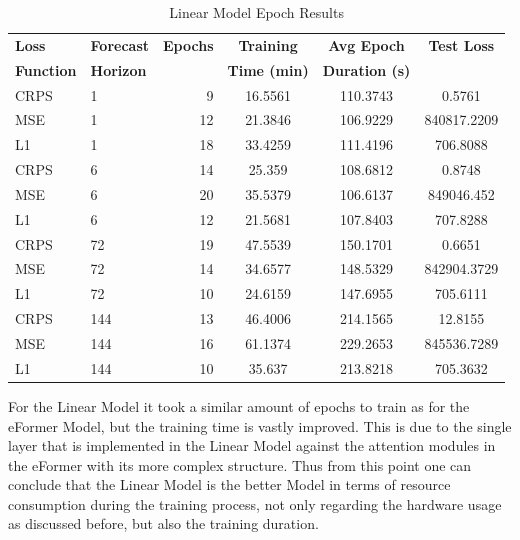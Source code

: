 \documentclass{article}
\begin{document}
\begin{table}
    \footnotesize
    \centering
    \caption{Linear Model Epoch Results}
    \begin{tabular}{l|l|r|S|S|S}
        \toprule
        \textbf{Loss} & \textbf{Forecast} & \textbf{Epochs} & \textbf{Training} & \textbf{Avg Epoch} & \textbf{Test Loss} \\
        \textbf{Function} & \textbf{Horizon} & & \textbf{Time (min)} & \textbf{Duration (s)} & \\
        \midrule
        CRPS & 1 & 9 & 16.5561 & 110.3743 & 0.5761 \\
        MSE & 1 & 12 & 21.3846 & 106.9229 & 840817.2209 \\
        L1 & 1 & 18 & 33.4259 & 111.4196 & 706.8088 \\
        \midrule
        CRPS & 6 & 14 & 25.359 & 108.6812 & 0.8748 \\
        MSE & 6 & 20 & 35.5379 & 106.6137 & 849046.452 \\
        L1 & 6 & 12 & 21.5681 & 107.8403 & 707.8288 \\
        \midrule
        CRPS & 72 & 19 & 47.5539 & 150.1701 & 0.6651 \\
        MSE & 72 & 14 & 34.6577 & 148.5329 & 842904.3729 \\
        L1 & 72 & 10 & 24.6159 & 147.6955 & 705.6111 \\
        \midrule
        CRPS & 144 & 13 & 46.4006 & 214.1565 & 12.8155 \\
        MSE & 144 & 16 & 61.1374 & 229.2653 & 845536.7289 \\
        L1 & 144 & 10 & 35.637 & 213.8218 & 705.3632 \\
    \bottomrule
    \end{tabular}
    \label{tab:linear_epoch}
\end{table}

For the Linear Model it took a similar amount of epochs to train as for the eFormer Model, but the training time is vastly improved. This is due to the single layer that is implemented in the Linear Model against the attention modules in the eFormer with its more complex structure. Thus from this point one can conclude that the Linear Model is the better Model in terms of resource consumption during the training process, not only regarding the hardware usage as discussed before, but also the training duration. 
\end{document}
